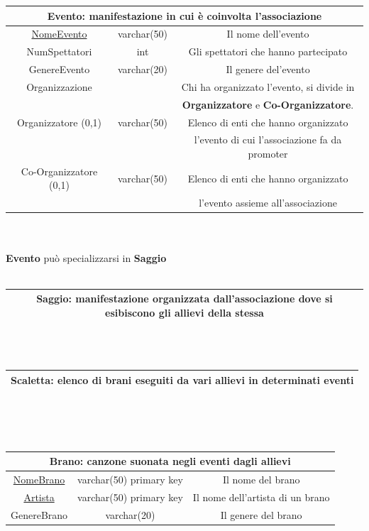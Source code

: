 \documentclass[11pt]{article}
\begin{document}
		\begin{tabular}{|c|c|c|}
			\hline
			\multicolumn{3}{|c|}{\textbf{Evento}: manifestazione in cui è coinvolta l'associazione}\\
			\hline
			\underline{NomeEvento} & varchar(50) & Il nome dell'evento\\
			\hline
			NumSpettatori & int & Gli spettatori che hanno partecipato\\
			\hline
			GenereEvento & varchar(20) & Il genere del'evento\\
			\hline
			Organizzazione &  & Chi ha organizzato l'evento, si divide in\\
			&  &\textbf{Organizzatore} e \textbf{Co-Organizzatore}.\\
			Organizzatore (0,1) & varchar(50) & Elenco di enti che hanno organizzato\\
			& & l'evento di cui l'associazione fa da promoter\\
			Co-Organizzatore (0,1) & varchar(50) & Elenco di enti che hanno organizzato \\
			& & l'evento assieme all'associazione\\
			\hline
		\end{tabular}
		\\\\
		\textbf{Evento} può specializzarsi in \textbf{Saggio}
		\\\\
		\begin{tabular}{|c|c|c|}
			\hline
			\multicolumn{3}{|c|}{\textbf{Saggio}: manifestazione organizzata dall'associazione dove si esibiscono gli allievi della stessa}\\
			\hline
		\end{tabular}
		\\\\
		\begin{tabular}{|c|c|c|}
			\hline
			\multicolumn{3}{|c|}{\textbf{Scaletta}: elenco di brani eseguiti da vari allievi in determinati eventi}\\
			\hline
		\end{tabular}
		\\\\\\
		\begin{tabular}{|c|c|c|}
			\hline
			\multicolumn{3}{|c|}{\textbf{Brano}: canzone suonata negli eventi dagli allievi}\\
			\hline
			\underline{NomeBrano} & varchar(50) primary key & Il nome del brano\\
			\hline
			\underline{Artista} & varchar(50) primary key & Il nome dell'artista di un brano\\
			\hline
			GenereBrano & varchar(20) & Il genere del brano\\
			\hline
		\end{tabular}
\end{document}
